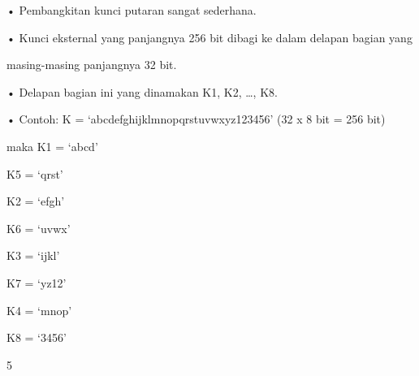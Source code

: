 \documentclass{article}
\begin{document}

• Pembangkitan kunci putaran sangat sederhana. 

• Kunci eksternal yang panjangnya 256 bit dibagi ke dalam delapan bagian yang 

masing-masing panjangnya 32 bit. 

• Delapan bagian ini yang dinamakan K1, K2, …, K8. 

• Contoh: K = ‘abcdefghijklmnopqrstuvwxyz123456’       (32 x 8 bit = 256 bit)



        maka K1 = ‘abcd’ 


K5 = ‘qrst’



K2 = ‘efgh’ 


K6 = ‘uvwx’



K3 = ‘ijkl’ 


K7 = ‘yz12’



K4 = ‘mnop’ 


K8 = ‘3456’

5
\end{document}
